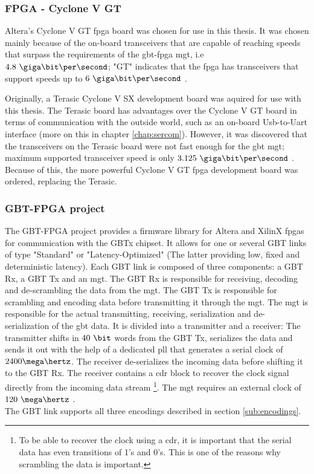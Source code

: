 \documentclass[main.tex]{subfiles}
\begin{document}
\subsubsection{FPGA - Cyclone V GT} \label{sec:cyclone}

Altera's Cyclone V GT \gls{fpga} board was chosen for use in this thesis. It was chosen mainly because of the on-board transceivers that are capable of reaching speeds that surpass the requirements of the \gls{gbt}-\gls{fpga} \gls{mgt}, i.e $4.8~\giga\bit\per\second$; "GT" indicates that the \gls{fpga} has transceivers that support speeds up to $6~\giga\bit\per\second$ \cite{altera_cvoverview15}.

Originally, a Terasic Cyclone V SX development board was aquired for use with this thesis. The Terasic board has advantages over the Cyclone V GT board in terms of communication with the outside world, such as an on-board Usb-to-Uart interface (more on this  in chapter \ref{chap:sercom}). However, it was discovered that the transceivers on the Terasic board were not fast enough for the \gls{gbt} \gls{mgt}; maximum supported transceiver speed is only $3.125~\giga\bit\per\second$ \cite{altera_cvoverview15}. Because of this, the more powerful Cyclone V GT \gls{fpga} development board was ordered, replacing the Terasic.

\subsubsection{GBT-FPGA project}

The GBT-FPGA project provides a firmware library for Altera and XilinX \glspl{fpga} for communication with the GBTx chipset. It allows for one or several GBT links of type "Standard" or "Latency-Optimized" (The latter providing low, fixed and deterministic latency). Each GBT link is composed of three components: a GBT Rx, a GBT Tx and an \gls{mgt}. The GBT Rx is responsible for receiving, decoding and de-scrambling the data from the \gls{mgt}.  The GBT Tx is responsible for scrambling and encoding data before transmitting it through the \gls{mgt}. The \gls{mgt} is responsible for the actual transmitting, receiving, serialization and de-serialization of the \gls{gbt} data. It is divided into a transmitter and a receiver: The transmitter shifts in $40~\bit$ words from the GBT Tx, serializes the data and sends it out with the help of a dedicated \acrshort{pll} that generates a serial clock of $2400 \mega\hertz$. The receiver de-serializes the incoming data before shifting it to the GBT Rx. The receiver contains a \gls{cdr} block to recover the clock signal directly from the incoming data stream \footnote{To be able to recover the clock using a \gls{cdr}, it is important that the serial data has even transitions of 1's and 0's. This is one of the reasons why scrambling the data is important.}. The \gls{mgt} requires an external clock of $120~\mega\hertz$ \cite{gbt_fpga}.\\
The GBT link supports all three encodings described in section \ref{sub:encodings}. 
\end{document}
